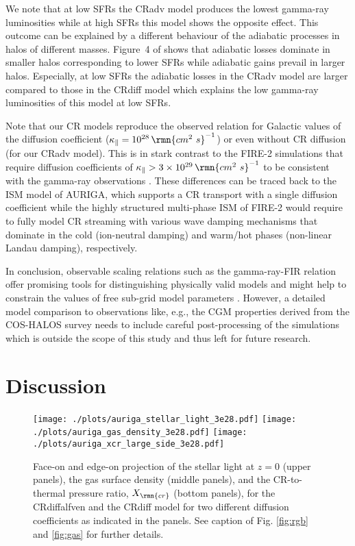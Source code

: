 \documentclass[useAMS,usenatbib]{mnras}
\begin{document}
We note that at low SFRs the CRadv model produces the lowest gamma-ray luminosities while at high SFRs this model shows the opposite effect. This outcome can be explained by a different behaviour of the adiabatic processes in halos of different masses. Figure~4 of \citet{Pfrommer2017} shows that adiabatic losses dominate in smaller halos corresponding to lower SFRs while adiabatic gains prevail in larger halos. Especially, at low SFRs the adiabatic losses in the CRadv model are larger compared to those in the CRdiff model which explains the low gamma-ray luminosities of this model at low SFRs.

Note that our CR models reproduce the observed relation for Galactic values of the diffusion coefficient ($\kappa_\parallel=10^{28}\,\rmn{cm^2~s}^{-1}$) or even without CR diffusion (for our CRadv model). This is in stark contrast to the FIRE-2 simulations that require diffusion coefficients of $\kappa_\parallel>3\times10^{29}\,\rmn{cm^2~s}^{-1}$ to be consistent with the gamma-ray observations \citep{Chan2019,Hopkins2019}. These differences can be traced back to the ISM model of AURIGA, which supports a CR transport with a single diffusion coefficient while the highly structured multi-phase ISM of FIRE-2 would require to fully model CR streaming with various wave damping mechanisms that dominate in the cold (ion-neutral damping) and warm/hot phases (non-linear Landau damping), respectively.

In conclusion, observable scaling relations such as the gamma-ray-FIR relation offer promising tools for distinguishing physically valid models and might help to constrain the values of free sub-grid model parameters \citep[e.g.][]{Buck2019}. However, a detailed model comparison to observations like, e.g., the CGM properties derived from the COS-HALOS survey \citep{Tumlinson2013} needs to include careful post-processing of the simulations which is outside the scope of this study and thus left for future research.


\section{Discussion} \label{sec:dis}


\begin{figure*}
\begin{center}
\vspace*{-.55cm}
\texttt{[image: ./plots/auriga\_stellar\_light\_3e28.pdf]}
\texttt{[image: ./plots/auriga\_gas\_density\_3e28.pdf]}
\texttt{[image: ./plots/auriga\_xcr\_large\_side\_3e28.pdf]}
\end{center}
\vspace{-.35cm}
\caption{Face-on and edge-on projection of the stellar light at $z=0$ (upper panels), the gas surface density (middle panels), and the CR-to-thermal pressure ratio, $X_{\rmn{cr}}$ (bottom panels), for the CRdiffalfven and the CRdiff model for two different diffusion coefficients as indicated in the panels. See caption of Fig. \ref{fig:rgb} and \ref{fig:gas} for further details.}
\label{fig:high_kappa}
\end{figure*}
\end{document}
